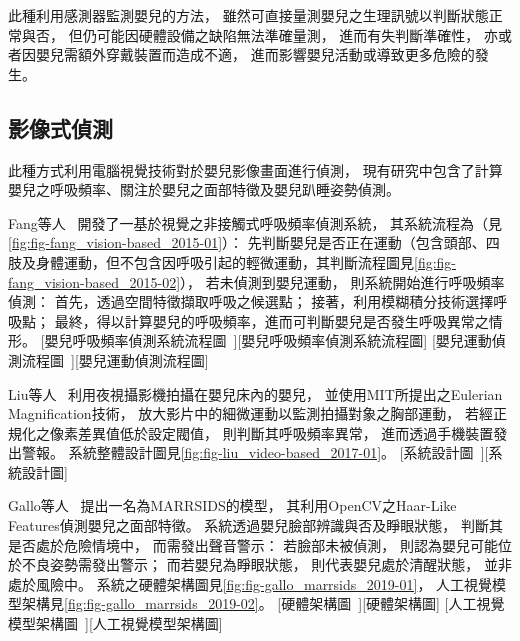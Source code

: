 \documentclass[class=NCU_thesis, crop=false]{standalone}
\begin{document}
此種利用感測器監測嬰兒的方法，
雖然可直接量測嬰兒之生理訊號以判斷狀態正常與否，
但仍可能因硬體設備之缺陷無法準確量測，
進而有失判斷準確性，
亦或者因嬰兒需額外穿戴裝置而造成不適，
進而影響嬰兒活動或導致更多危險的發生。

\subsection{影像式偵測}
此種方式利用電腦視覺技術對於嬰兒影像畫面進行偵測，
現有研究中包含了計算嬰兒之呼吸頻率、關注於嬰兒之面部特徵及嬰兒趴睡姿勢偵測。

Fang等人~\cite{fang_vision-based_2015}
開發了一基於視覺之非接觸式呼吸頻率偵測系統，
其系統流程為（見\cref{fig:fig-fang_vision-based_2015-01}）：
先判斷嬰兒是否正在運動（包含頭部、四肢及身體運動，但不包含因呼吸引起的輕微運動，其判斷流程圖見\cref{fig:fig-fang_vision-based_2015-02}），
若未偵測到嬰兒運動，
則系統開始進行呼吸頻率偵測：
首先，透過空間特徵擷取呼吸之候選點；
接著，利用模糊積分技術選擇呼吸點；
最終，得以計算嬰兒的呼吸頻率，進而可判斷嬰兒是否發生呼吸異常之情形。
[嬰兒呼吸頻率偵測系統流程圖~\cite{fang_vision-based_2015}][嬰兒呼吸頻率偵測系統流程圖]
[嬰兒運動偵測流程圖~\cite{fang_vision-based_2015}][嬰兒運動偵測流程圖]

Liu等人~\cite{liu_video-based_2017}
利用夜視攝影機拍攝在嬰兒床內的嬰兒，
並使用MIT所提出之Eulerian Magnification技術，
放大影片中的細微運動以監測拍攝對象之胸部運動，
若經正規化之像素差異值低於設定閥值，
則判斷其呼吸頻率異常，
進而透過手機裝置發出警報。
系統整體設計圖見\cref{fig:fig-liu_video-based_2017-01}。
[系統設計圖~\cite{liu_video-based_2017}][系統設計圖]

Gallo等人~\cite{gallo_marrsids_2019}
提出一名為MARRSIDS的模型，
其利用OpenCV之Haar-Like Features偵測嬰兒之面部特徵。
系統透過嬰兒臉部辨識與否及睜眼狀態，
判斷其是否處於危險情境中，
而需發出聲音警示：
若臉部未被偵測，
則認為嬰兒可能位於不良姿勢需發出警示；
而若嬰兒為睜眼狀態，
則代表嬰兒處於清醒狀態，
並非處於風險中。
系統之硬體架構圖見\cref{fig:fig-gallo_marrsids_2019-01}，
人工視覺模型架構見\cref{fig:fig-gallo_marrsids_2019-02}。
[硬體架構圖~\cite{gallo_marrsids_2019}][硬體架構圖]
[人工視覺模型架構圖~\cite{gallo_marrsids_2019}][人工視覺模型架構圖]
\end{document}
